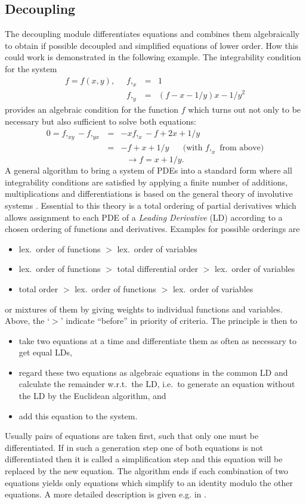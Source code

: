 \subsection{Decoupling}
The decoupling module differentiates equations and combines them algebraically
to obtain if possible decoupled and simplified equations of lower order.
How this could work is demonstrated in the following example.
The integrability condition for the system
\[ \begin{array}{cccl}
f = f(x,y), \; \; & f,_{x} & = & 1   \\
                  & f,_{y} & = & (f-x-1/y)x - 1/y^2
\end{array}  \]
provides an algebraic condition for the function $f$
which turns out not only to be necessary but also sufficient to solve both
equations:
\begin{eqnarray*}
 0 = f,_{xy} - f,_{yx} & = & - xf,_x - f + 2x + 1/y \\
                       & = & - f + x + 1/y \; \; \; \; \; \;
 \mbox{(with $f,_x$ from above)}
\end{eqnarray*}
\[ \rightarrow f = x + 1/y. \]
A general algorithm to bring a system of PDEs into a standard form
where all integrability conditions are satisfied by applying
a finite number of additions, multiplications and differentiations
is based on the general theory of involutive systems \cite{Riq,Th,Ja}.
Essential to this theory is a total ordering of partial derivatives
which allows assignment to each PDE of a {\em Leading Derivative} 
(LD) according to a chosen ordering of functions
and derivatives. Examples for possible orderings are 
\begin{itemize}
\item lex.\ order of functions $>$ lex.\ order of variables 
\item lex.\ order of functions $>$ total differential order $>$ lex.\ 
      order of variables 
\item total order $>$ lex.\ order of functions $>$ lex.\ order of variables
\end{itemize}
or mixtures of them by giving weights to individual functions and variables.
Above, the `$>$' indicate ``before'' in priority of criteria. The principle
is then to
\begin{itemize}
\item take two equations at a time and differentiate them as often as 
necessary to get equal LDs,
\item regard these two equations as algebraic equations in
the common LD and calculate the remainder w.r.t.\ the LD, i.e.\ to
generate an equation without the LD by the Euclidean algorithm, and
\item add this equation to the system.
\end{itemize}
Usually pairs of equations are taken first, such that only one must be
differentiated. If in such a generation step one of both equations is not
differentiated then it is called a
simplification step and this equation will be replaced by the new equation.
The algorithm ends if each combination of two equations yields only equations
which simplify to an identity modulo the other equations.
A more detailed description is given e.g. in \cite{Alex,Reid1}.

